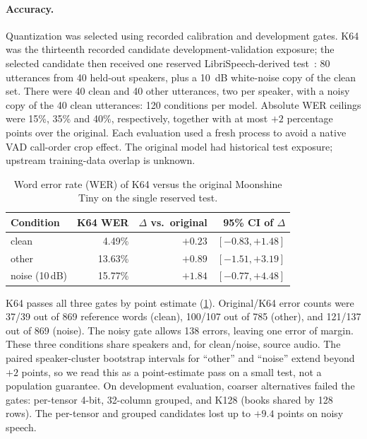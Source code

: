 \paragraph{Accuracy.}
Quantization was selected using recorded calibration and development gates. K64 was the thirteenth recorded candidate development-validation exposure; the selected candidate then received one reserved LibriSpeech-derived test~\cite{panayotov2015librispeech}: 80 utterances from 40 held-out speakers, plus a \SI{10}{dB} white-noise copy of the clean set. There were 40 clean and 40 other utterances, two per speaker, with a noisy copy of the 40 clean utterances: 120 conditions per model. Absolute WER ceilings were 15\%, 35\% and 40\%, respectively, together with at most $+2$ percentage points over the original. Each evaluation used a fresh process to avoid a native VAD call-order crop effect. The original model had historical test exposure; upstream training-data overlap is unknown.

\begin{table}[t]
\centering\small
\caption{Word error rate (WER) of K64 versus the original Moonshine Tiny on the single reserved test.}
\label{tab:wer}
\begin{tabular}{@{}lrrr@{}}
\toprule
Condition & K64 WER & $\Delta$ vs.\ original & 95\% CI of $\Delta$\\
\midrule
clean & 4.49\% & $+0.23$ & $[-0.83, +1.48]$\\
other & 13.63\% & $+0.89$ & $[-1.51, +3.19]$\\
noise (10\,dB) & 15.77\% & $+1.84$ & $[-0.77, +4.48]$\\
\bottomrule
\end{tabular}
\end{table}

K64 passes all three gates by point estimate (\cref{tab:wer}). Original/K64 error counts were 37/39 out of 869 reference words (clean), 100/107 out of 785 (other), and 121/137 out of 869 (noise). The noisy gate allows 138 errors, leaving one error of margin. These three conditions share speakers and, for clean/noise, source audio. The paired speaker-cluster bootstrap intervals for ``other'' and ``noise'' extend beyond $+2$ points, so we read this as a point-estimate pass on a small test, not a population guarantee. On development evaluation, coarser alternatives failed the gates: per-tensor 4-bit, 32-column grouped, and K128 (books shared by 128 rows). The per-tensor and grouped candidates lost up to $+9.4$ points on noisy speech.


